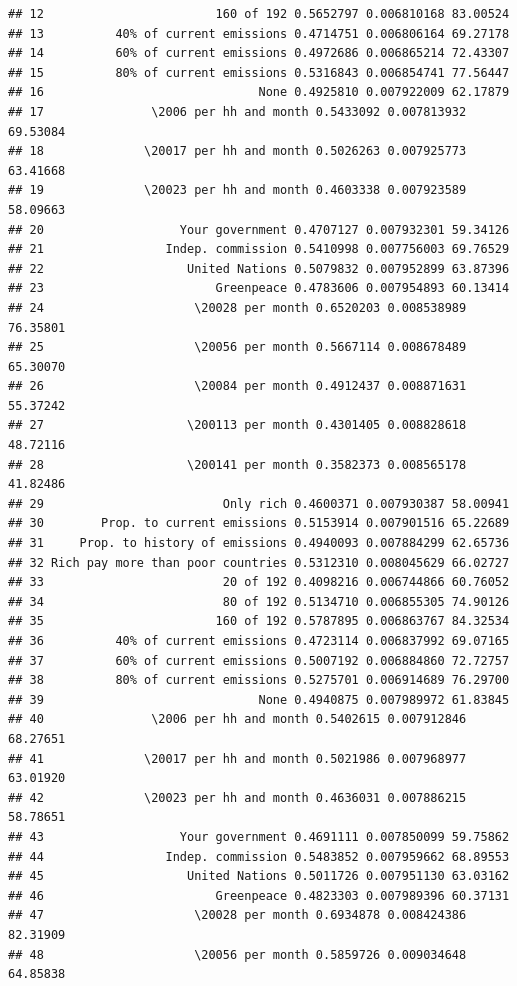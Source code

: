 \documentclass[a4paper,12pt]{article}\usepackage[]{graphicx}\usepackage[]{color}
\makeatletter
\newenvironment{kframe}{%
 \def\at@end@of@kframe{}%
 \ifinner\ifhmode%
  \def\at@end@of@kframe{\end{minipage}}%
  \begin{minipage}{\columnwidth}%
 \fi\fi%
 \def\FrameCommand##1{\hskip\@totalleftmargin \hskip-\fboxsep
 \colorbox{shadecolor}{##1}\hskip-\fboxsep
     \hskip-\linewidth \hskip-\@totalleftmargin \hskip\columnwidth}%
 \MakeFramed {\advance\hsize-\width
   \@totalleftmargin\z@ \linewidth\hsize
   \@setminipage}}%
 {\par\unskip\endMakeFramed%
 \at@end@of@kframe}
\newenvironment{knitrout}{}{} %
\makeatother
\begin{document}
\begin{knitrout}
\begin{kframe}
\begin{verbatim}
## 12                        160 of 192 0.5652797 0.006810168 83.00524
## 13          40% of current emissions 0.4714751 0.006806164 69.27178
## 14          60% of current emissions 0.4972686 0.006865214 72.43307
## 15          80% of current emissions 0.5316843 0.006854741 77.56447
## 16                              None 0.4925810 0.007922009 62.17879
## 17               \2006 per hh and month 0.5433092 0.007813932 69.53084
## 18              \20017 per hh and month 0.5026263 0.007925773 63.41668
## 19              \20023 per hh and month 0.4603338 0.007923589 58.09663
## 20                   Your government 0.4707127 0.007932301 59.34126
## 21                 Indep. commission 0.5410998 0.007756003 69.76529
## 22                    United Nations 0.5079832 0.007952899 63.87396
## 23                        Greenpeace 0.4783606 0.007954893 60.13414
## 24                     \20028 per month 0.6520203 0.008538989 76.35801
## 25                     \20056 per month 0.5667114 0.008678489 65.30070
## 26                     \20084 per month 0.4912437 0.008871631 55.37242
## 27                    \200113 per month 0.4301405 0.008828618 48.72116
## 28                    \200141 per month 0.3582373 0.008565178 41.82486
## 29                         Only rich 0.4600371 0.007930387 58.00941
## 30        Prop. to current emissions 0.5153914 0.007901516 65.22689
## 31     Prop. to history of emissions 0.4940093 0.007884299 62.65736
## 32 Rich pay more than poor countries 0.5312310 0.008045629 66.02727
## 33                         20 of 192 0.4098216 0.006744866 60.76052
## 34                         80 of 192 0.5134710 0.006855305 74.90126
## 35                        160 of 192 0.5787895 0.006863767 84.32534
## 36          40% of current emissions 0.4723114 0.006837992 69.07165
## 37          60% of current emissions 0.5007192 0.006884860 72.72757
## 38          80% of current emissions 0.5275701 0.006914689 76.29700
## 39                              None 0.4940875 0.007989972 61.83845
## 40               \2006 per hh and month 0.5402615 0.007912846 68.27651
## 41              \20017 per hh and month 0.5021986 0.007968977 63.01920
## 42              \20023 per hh and month 0.4636031 0.007886215 58.78651
## 43                   Your government 0.4691111 0.007850099 59.75862
## 44                 Indep. commission 0.5483852 0.007959662 68.89553
## 45                    United Nations 0.5011726 0.007951130 63.03162
## 46                        Greenpeace 0.4823303 0.007989396 60.37131
## 47                     \20028 per month 0.6934878 0.008424386 82.31909
## 48                     \20056 per month 0.5859726 0.009034648 64.85838

\end{verbatim}
\end{kframe}
\end{knitrout}
\end{document}
